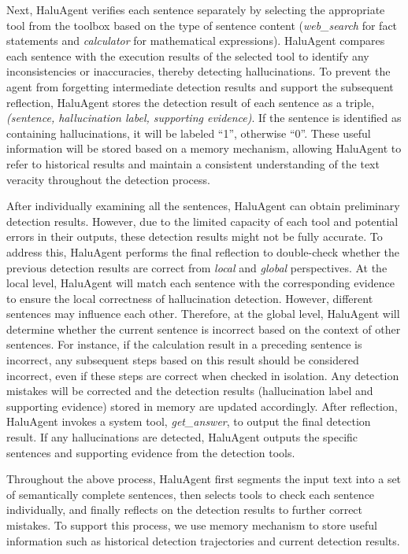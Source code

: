 Next, HaluAgent verifies each sentence separately by selecting the appropriate tool from the toolbox based on the type of sentence content (\eg \textit{web\_search} for fact statements and \textit{calculator} for mathematical expressions). HaluAgent compares each sentence with the execution results of the selected tool to identify any inconsistencies or inaccuracies, thereby detecting hallucinations.
To prevent the agent from forgetting intermediate detection results and support the subsequent reflection, HaluAgent stores the detection result of each sentence as a triple, \ie \emph{(sentence, hallucination label, supporting evidence)}. If the sentence is identified as containing hallucinations, it will be labeled ``1'', otherwise ``0''. These useful information will be stored based on a memory mechanism,
allowing HaluAgent to refer to historical results and maintain a consistent understanding of the text veracity throughout the detection process.

After individually examining all the sentences, HaluAgent can obtain preliminary detection results. However, due to the limited capacity of each tool and potential errors in their outputs, these detection results might not be fully accurate. 
To address this, HaluAgent performs the final reflection to double-check whether the previous detection results are correct from \emph{local} and \emph{global} perspectives. At the local level, HaluAgent will match each sentence with the corresponding evidence to ensure the local correctness of hallucination detection. However, different sentences may influence each other. Therefore, at the global level, HaluAgent will determine whether the current sentence is incorrect based on the context of other sentences.
For instance, if the calculation result in a preceding sentence is incorrect, any subsequent steps based on this result should be considered incorrect, even if these steps are correct when checked in isolation.
Any detection mistakes will be corrected and the detection results (\ie hallucination label and supporting evidence) stored in memory are updated accordingly.
After reflection, HaluAgent invokes a system tool, \textit{get\_answer}, to output the final detection result. If any hallucinations are detected, HaluAgent outputs the specific sentences and supporting evidence from the detection tools.



Throughout the above process, HaluAgent first segments the input text into a set of semantically complete sentences, then selects tools to check each sentence individually, and finally reflects on the detection results to further correct mistakes. To support this process, we use memory mechanism to store useful information such as historical detection trajectories and current detection results.




